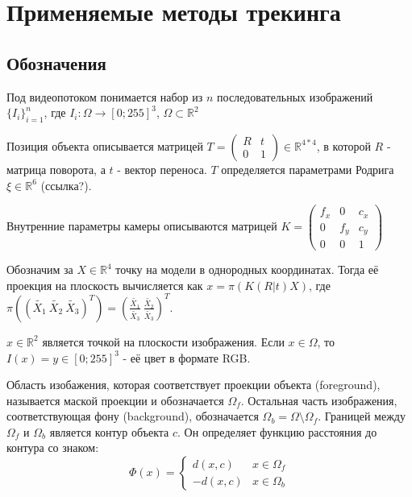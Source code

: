 \section{Применяемые методы трекинга}

\subsection{Обозначения}


Под видеопотоком понимается набор из $n$ последовательных изображений
$\{I_i\}_{i = 1}^n$,
где
$I_i: \Omega \rightarrow [0; 255]^3$,
$\Omega \subset \mathbb{R}^2$

Позиция объекта описывается матрицей
$
    T =
    \begin{pmatrix}
      R& t\\
      0& 1
    \end{pmatrix} \in \mathbb{R}^{4*4}
$,
в которой $R$ - матрица поворота, а $t$ - вектор переноса.
$T$ определяется параметрами Родрига
$\xi \in \mathbb{R}^6$
(ссылка?).

Внутренние параметры камеры описываются матрицей
$
    K = 
    \begin{pmatrix}
      f_x& 0& c_x\\
      0& f_y& c_y\\
      0& 0& 1
    \end{pmatrix}
$

Обозначим за
$X \in \mathbb{R}^4$
точку на модели в однородных координатах.
Тогда её проекция на плоскость вычисляется как
$x = \pi(K(R | t) X)$,
где
$
    \pi(
        (\tilde{X_1}\ \tilde{X_2}\ \tilde{X_3})^T
    ) = (\frac{\tilde{X_1}}{\tilde{X_3}} \ \frac{\tilde{X_2}}{\tilde{X_3}})^T
$.

$x \in \mathbb{R}^2$
является точкой на плоскости изображения.
Если $x \in \Omega$, то $I(x) = y \in [0; 255]^3$ - её цвет в формате RGB.

Область изобажения, которая соответствует проекции объекта (foreground),
называется маской проекции и обозначается $\Omega_f$.
Остальная часть изображения, соответствующая фону (background), обозначается
$\Omega_b = \Omega \setminus \Omega_f$.
Границей между $\Omega_f$ и $\Omega_b$ является контур
объекта $c$.
Он определяет функцию расстояния до контура со знаком:
\begin{equation*}
    \Phi(x) = 
     \begin{cases}
       d(x, c) &x \in \Omega_f\\
       -d(x, c) &x \in \Omega_b
     \end{cases}
\end{equation*}

